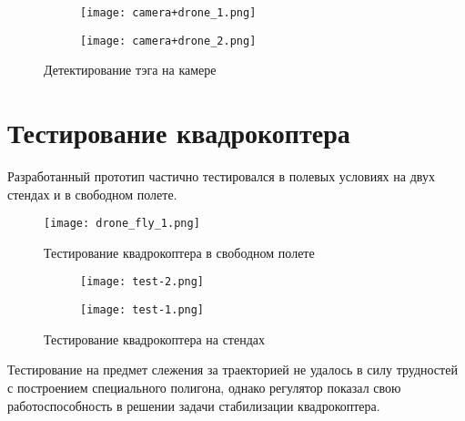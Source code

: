 \begin{figure}[ht]
	\centering
\hspace*{\fill}%
	\begin{subfigure}[b]{0.49\textwidth}
        \centering
		\texttt{[image: camera+drone\_1.png]}
		\caption{}
		\label{fig:tiger1}
	\end{subfigure}
\hfill
	\begin{subfigure}[b]{0.49\textwidth}
        \centering
		\texttt{[image: camera+drone\_2.png]}
        \caption{}
		\label{fig:tiger2}
	\end{subfigure}
\hspace*{\fill}%
	\caption{Детектирование тэга на камере}
	\label{fig:tiger}
\end{figure}

\newpage


\section{Тестирование квадрокоптера}

Разработанный прототип частично тестировался в полевых условиях на двух стендах и в свободном полете.


\begin{figure}[ht]
    \centering
    \texttt{[image: drone\_fly\_1.png]}
    \caption{Тестирование квадрокоптера в свободном полете}
    \label{}
\end{figure}

\begin{figure}[ht]
	\centering
\hspace*{\fill}%
	\begin{subfigure}[b]{0.49\textwidth}
        \centering
		\texttt{[image: test-2.png]}
		\caption{}
		\label{fig:tiger1}
	\end{subfigure}
\hfill
	\begin{subfigure}[b]{0.49\textwidth}
        \centering
		\texttt{[image: test-1.png]}
        \caption{}
		\label{fig:tiger2}
	\end{subfigure}
\hspace*{\fill}%
	\caption{Тестирование квадрокоптера на стендах}
	\label{fig:tiger}
\end{figure}

Тестирование на предмет слежения за траекторией не удалось в силу трудностей с построением специального полигона, 
однако
регулятор показал свою работоспособность в решении задачи стабилизации 
квадрокоптера. 


\endinput
